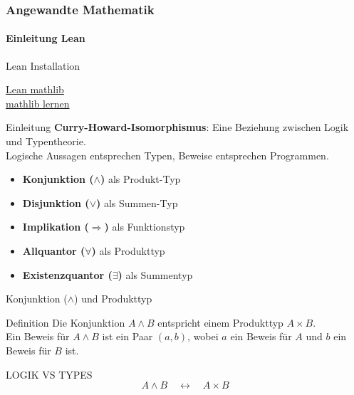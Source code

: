 \documentclass{beamer}
\begin{document}
 \begin{frame}
    \frametitle{Angewandte Mathematik}
\framesubtitle{Einleitung Lean}
    \begin{block}{Lean Installation}

        
        \href{https://github.com/leanprover-community/mathlib4}{Lean mathlib} \\
        \href{https://adam.math.hhu.de/}{mathlib lernen} 


    \end{block}

 \end{frame}


\begin{frame}{Einleitung}
    \textbf{Curry-Howard-Isomorphismus}: Eine Beziehung zwischen Logik und Typentheorie. \\
    \vspace{0.5cm}
    Logische Aussagen entsprechen Typen, Beweise entsprechen Programmen. \\
    \vspace{0.5cm}
    \begin{itemize}
        \item \textbf{Konjunktion (\(\wedge\))} als Produkt-Typ
        \item \textbf{Disjunktion (\(\vee\))} als Summen-Typ
        \item \textbf{Implikation (\(\Rightarrow\))} als Funktionstyp
        \item \textbf{Allquantor (\(\forall\))} als Produkttyp
        \item \textbf{Existenzquantor (\(\exists\))} als Summentyp
    \end{itemize}
\end{frame}

\begin{frame}{Konjunktion (\(\wedge\)) und Produkttyp}
    \begin{block}{Definition}
        Die Konjunktion \( A \wedge B \) entspricht einem Produkttyp \( A \times B \). \\
        Ein Beweis für \( A \wedge B \) ist ein Paar \((a, b)\), wobei \( a \) ein Beweis für \( A \) und \( b \) ein Beweis für \( B \) ist.
    \end{block}

    \begin{block}{LOGIK VS TYPES}
        \[
        A \wedge B \quad \leftrightarrow \quad A \times B
        \]
    \end{block}
    
\end{frame}
\end{document}
